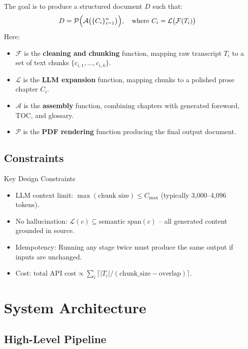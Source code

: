 \documentclass[11pt,a4paper]{article}
\begin{document}
The goal is to produce a structured document $D$ such that:
\[
D = \mathcal{P}\Bigl(\mathcal{A}\bigl(\{C_i\}_{i=1}^{n}\bigr)\Bigr), \quad \text{where } C_i = \mathcal{L}\bigl(\mathcal{F}(T_i)\bigr)
\]
Here:
\begin{itemize}[leftmargin=1.5em]
    \item $\mathcal{F}$ is the \textbf{cleaning and chunking} function, mapping raw transcript $T_i$ to a set of text chunks $\{c_{i,1}, \ldots, c_{i,k}\}$.
    \item $\mathcal{L}$ is the \textbf{LLM expansion} function, mapping chunks to a polished prose chapter $C_i$.
    \item $\mathcal{A}$ is the \textbf{assembly} function, combining chapters with generated foreword, TOC, and glossary.
    \item $\mathcal{P}$ is the \textbf{PDF rendering} function producing the final output document.
\end{itemize}

\subsection{Constraints}

\begin{designbox}{Key Design Constraints}
\begin{itemize}[leftmargin=1em]
    \item LLM context limit: $\max(\text{chunk size}) \leq C_{\max}$ (typically 3,000--4,096 tokens).
    \item No hallucination: $\mathcal{L}(c) \subseteq \text{semantic span}(c)$ -- all generated content grounded in source.
    \item Idempotency: Running any stage twice must produce the same output if inputs are unchanged.
    \item Cost: $\text{total API cost} \propto \sum_{i} \lceil |T_i| / (\text{chunk\_size} - \text{overlap}) \rceil$.
\end{itemize}
\end{designbox}

\section{System Architecture}

\subsection{High-Level Pipeline}
\end{document}
